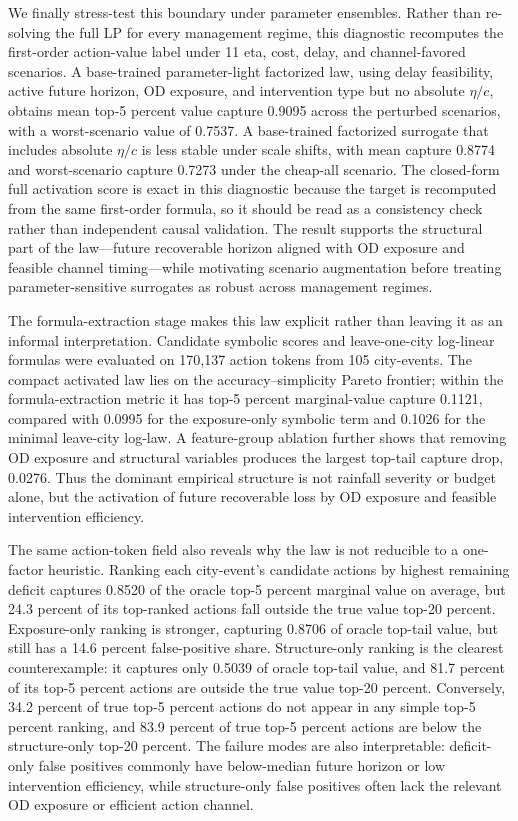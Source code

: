 We finally stress-test this boundary under parameter ensembles. Rather than re-solving the full LP for every management regime, this diagnostic recomputes the first-order action-value label under 11 eta, cost, delay, and channel-favored scenarios. A base-trained parameter-light factorized law, using delay feasibility, active future horizon, OD exposure, and intervention type but no absolute \(\eta/c\), obtains mean top-5 percent value capture 0.9095 across the perturbed scenarios, with a worst-scenario value of 0.7537. A base-trained factorized surrogate that includes absolute \(\eta/c\) is less stable under scale shifts, with mean capture 0.8774 and worst-scenario capture 0.7273 under the cheap-all scenario. The closed-form full activation score is exact in this diagnostic because the target is recomputed from the same first-order formula, so it should be read as a consistency check rather than independent causal validation. The result supports the structural part of the law---future recoverable horizon aligned with OD exposure and feasible channel timing---while motivating scenario augmentation before treating parameter-sensitive surrogates as robust across management regimes.

The formula-extraction stage makes this law explicit rather than leaving it as an informal interpretation. Candidate symbolic scores and leave-one-city log-linear formulas were evaluated on 170,137 action tokens from 105 city-events. The compact activated law lies on the accuracy--simplicity Pareto frontier; within the formula-extraction metric it has top-5 percent marginal-value capture 0.1121, compared with 0.0995 for the exposure-only symbolic term and 0.1026 for the minimal leave-city log-law. A feature-group ablation further shows that removing OD exposure and structural variables produces the largest top-tail capture drop, 0.0276. Thus the dominant empirical structure is not rainfall severity or budget alone, but the activation of future recoverable loss by OD exposure and feasible intervention efficiency.

The same action-token field also reveals why the law is not reducible to a one-factor heuristic. Ranking each city-event's candidate actions by highest remaining deficit captures 0.8520 of the oracle top-5 percent marginal value on average, but 24.3 percent of its top-ranked actions fall outside the true value top-20 percent. Exposure-only ranking is stronger, capturing 0.8706 of oracle top-tail value, but still has a 14.6 percent false-positive share. Structure-only ranking is the clearest counterexample: it captures only 0.5039 of oracle top-tail value, and 81.7 percent of its top-5 percent actions are outside the true value top-20 percent. Conversely, 34.2 percent of true top-5 percent actions do not appear in any simple top-5 percent ranking, and 83.9 percent of true top-5 percent actions are below the structure-only top-20 percent. The failure modes are also interpretable: deficit-only false positives commonly have below-median future horizon or low intervention efficiency, while structure-only false positives often lack the relevant OD exposure or efficient action channel.

